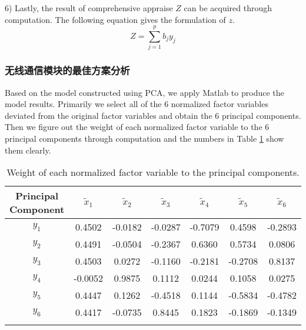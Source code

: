 \documentclass{apmcmthesis}
\begin{document}
6) Lastly, the result of comprehensive appraise $Z$ can be acquired through computation. The following equation gives the formulation of $z$.
\begin{equation}
Z=\sum\limits_{j=1}^{p}{{{b}_{j}}{{y}_{j}}}
\end{equation}
\subsubsection{无线通信模块的最佳方案分析}
\hspace{2em}Based on the model constructed using PCA, we apply Matlab to produce the model results. Primarily we select all of the 6 normalized factor variables deviated from the original factor variables and obtain the 6 principal components. Then we figure out the weight of each normalized factor variable to the 6 principal components through computation and the numbers in Table \ref{table2} show them clearly.
\begin{table}[h]
\centering
\footnotesize
\caption{Weight of each normalized factor variable to the principal components.}
\begin{tabular}{ccccccc}
\toprule
\textbf{Principal Component}& \textbf{${\tilde{x}}_{1}$}&\textbf{${\tilde{x}}_{2}$}&\textbf{${\tilde{x}}_{3}$}&\textbf{${\tilde{x}}_{4}$}&\textbf{${\tilde{x}}_{5}$}&\textbf{${\tilde{x}}_{6}$}\\
\midrule
\textbf{$y_1$} & 0.4502 & -0.0182 &-0.0287 &-0.7079 &0.4598 &-0.2893\\
\textbf{$y_2$} & 0.4491 & -0.0504 &-0.2367 &0.6360  &0.5734 &0.0806\\
\textbf{$y_3$} & 0.4503 & 0.0272  &-0.1160 &-0.2181 &-0.2708&0.8137\\
\textbf{$y_4$} & -0.0052 & 0.9875 &0.1112  &0.0244  &0.1058 &0.0275\\
\textbf{$y_5$} & 0.4447 & 0.1262  &-0.4518 &0.1144  &-0.5834&-0.4782\\
\textbf{$y_6$} & 0.4417 & -0.0735 &0.8445  &0.1823  &-0.1869&-0.1349\\
\bottomrule\label{table2}
\end{tabular}
\end{table}
\end{document}
